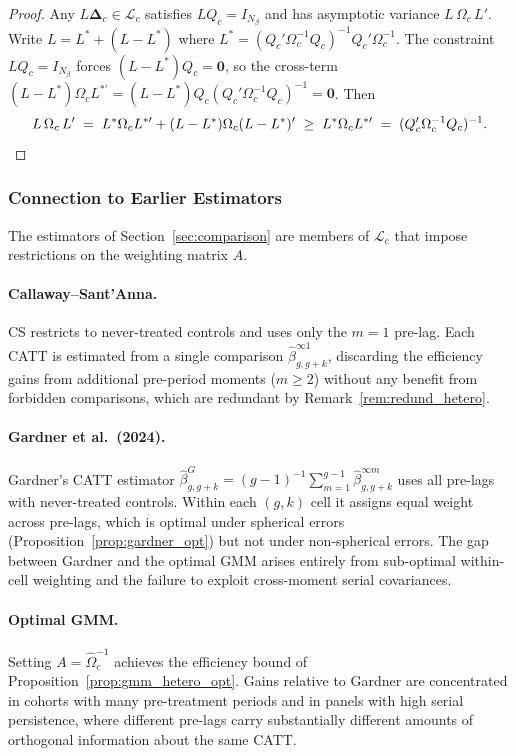 \documentclass[12pt,letterpaper]{article}
\theoremstyle{remark}
\theoremstyle{definition}
\newcommand{\hbeta}{\hat{\beta}}
\begin{document}
\begin{proof}
  Any $L\boldsymbol{\Delta}_c\in\mathcal{L}_c$ satisfies $LQ_c=I_{N_\beta}$
  and has asymptotic variance $L\,\Omega_c\,L'$. Write $L=L^*+(L-L^*)$
  where $L^*=(Q_c'\Omega_c^{-1}Q_c)^{-1}Q_c'\Omega_c^{-1}$. The constraint
  $LQ_c=I_{N_\beta}$ forces $(L-L^*)Q_c=\mathbf{0}$, so the cross-term
  $(L-L^*)\Omega_c L^{*\prime}=(L-L^*)Q_c(Q_c'\Omega_c^{-1}Q_c)^{-1}
  =\mathbf{0}$. Then
  \[
    L\,\Omega_c\,L'
    \;=\;
    L^*\Omega_c L^{*\prime}
    + (L-L^*)\Omega_c(L-L^*)'
    \;\geq\;
    L^*\Omega_c L^{*\prime}
    \;=\;
    (Q_c'\Omega_c^{-1}Q_c)^{-1}.\qedhere
  \]
\end{proof}

\subsubsection{Connection to Earlier Estimators}
\label{sec:gmm_connection}

The estimators of Section~\ref{sec:comparison} are members of
$\mathcal{L}_c$ that impose restrictions on the weighting matrix $A$.

\paragraph{Callaway--Sant'Anna.}
CS restricts to never-treated controls and uses only the $m=1$ pre-lag.
Each CATT is estimated from a single comparison $\hbeta^{\infty1}_{g,g+k}$,
discarding the efficiency gains from additional pre-period moments ($m\geq2$)
without any benefit from forbidden comparisons, which are redundant by
Remark~\ref{rem:redund_hetero}.

\paragraph{Gardner et al.\ (2024).}
Gardner's CATT estimator $\hbeta^G_{g,g+k}=(g-1)^{-1}\sum_{m=1}^{g-1}
\hbeta^{\infty m}_{g,g+k}$ uses all pre-lags with never-treated controls.
Within each $(g,k)$ cell it assigns equal weight across pre-lags, which is
optimal under spherical errors (Proposition~\ref{prop:gardner_opt}) but not
under non-spherical errors. The gap between Gardner and the optimal GMM
arises entirely from sub-optimal within-cell weighting and the failure to
exploit cross-moment serial covariances.

\paragraph{Optimal GMM.}
Setting $A=\hat{\Omega}_c^{-1}$ achieves the efficiency bound of
Proposition~\ref{prop:gmm_hetero_opt}. Gains relative to Gardner are
concentrated in cohorts with many pre-treatment periods and in panels with
high serial persistence, where different pre-lags carry substantially
different amounts of orthogonal information about the same CATT.
\end{document}
